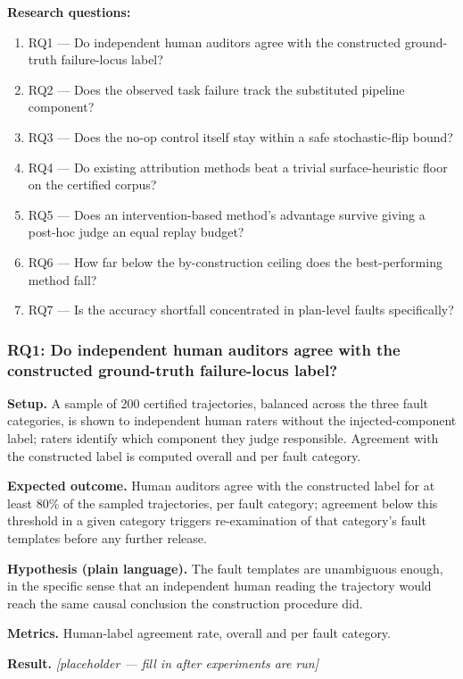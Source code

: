 \documentclass[11pt]{article}
\newcommand{\ph}{\textit{[placeholder --- fill in after experiments are run]}}
\begin{document}
\textbf{Research questions:}
\begin{enumerate}[leftmargin=1.6em]
\item RQ1 --- Do independent human auditors agree with the constructed ground-truth failure-locus label?
\item RQ2 --- Does the observed task failure track the substituted pipeline component?
\item RQ3 --- Does the no-op control itself stay within a safe stochastic-flip bound?
\item RQ4 --- Do existing attribution methods beat a trivial surface-heuristic floor on the certified corpus?
\item RQ5 --- Does an intervention-based method's advantage survive giving a post-hoc judge an equal replay budget?
\item RQ6 --- How far below the by-construction ceiling does the best-performing method fall?
\item RQ7 --- Is the accuracy shortfall concentrated in plan-level faults specifically?
\end{enumerate}

\subsubsection{RQ1: Do independent human auditors agree with the constructed ground-truth failure-locus label?}
\textbf{Setup.} A sample of 200 certified trajectories, balanced across the three fault categories, is shown to independent human raters without the injected-component label; raters identify which component they judge responsible. Agreement with the constructed label is computed overall and per fault category.

\textbf{Expected outcome.} Human auditors agree with the constructed label for at least 80\% of the sampled trajectories, per fault category; agreement below this threshold in a given category triggers re-examination of that category's fault templates before any further release.

\textbf{Hypothesis (plain language).} The fault templates are unambiguous enough, in the specific sense that an independent human reading the trajectory would reach the same causal conclusion the construction procedure did.

\textbf{Metrics.} Human-label agreement rate, overall and per fault category.

\textbf{Result.} \ph
\end{document}
